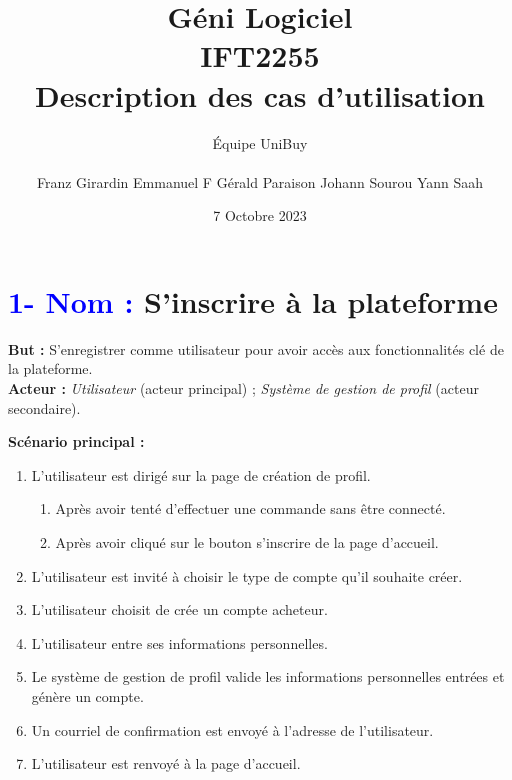 \documentclass[16pt]{report}
\title{\Huge{Géni Logiciel}\\{IFT2255}\\{\textbf{Description des cas d'utilisation}}}
\author{\huge{Équipe UniBuy} \\\\ \cross \;\; Franz Girardin \;\;\;\; \cross \;  Emmanuel F Gérald Paraison \;\;\;\; \cross \;\;Johann Sourou \;\;\;\;  \cross \;\;Yann Saah}
\date{7 Octobre 2023}
\begin{document}
\maketitle
\pagebreak
\twocolumn





\section*{\textbf{\textcolor{blue}{1- Nom :}} S'inscrire à la plateforme}
\textbf{But :} S'enregistrer comme utilisateur pour avoir accès aux fonctionnalités clé de la plateforme. \\
\textbf{Acteur :} \textit{Utilisateur} (acteur principal) ; \textit{Système de gestion de profil} (acteur secondaire).

\textbf{Scénario principal :}
\begin{enumerate}[leftmargin=4em]
    \item L'utilisateur est dirigé sur la page de création de profil.
    \begin{enumerate}[leftmargin=4em]
        \item Après avoir tenté d'effectuer une commande sans être connecté.
        \item Après avoir cliqué sur le bouton s'inscrire de la page d'accueil.
    \end{enumerate}
    \item L'utilisateur est invité à choisir le type de compte qu'il souhaite créer.
    \item L'utilisateur choisit de crée un compte acheteur.
    \item L'utilisateur entre ses informations personnelles.
    \item Le système de gestion de profil valide les informations personnelles entrées et génère un compte.
    \item Un courriel de confirmation est envoyé à l'adresse de l'utilisateur.
    \item L'utilisateur est renvoyé à la page d'accueil.
\end{enumerate}
\end{document}
